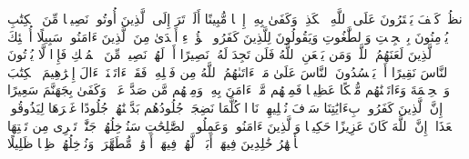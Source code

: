\stopbuffer
\startbuffer[\q:4:50]
ٱنظُرۡ كَیۡفَ یَفۡتَرُونَ عَلَى ٱللَّهِ ٱلۡكَذِبَۖ وَكَفَىٰ بِهِۦۤ إِثۡمࣰا مُّبِینًا%
\stopbuffer
\startbuffer[\q:4:51]
أَلَمۡ تَرَ إِلَى ٱلَّذِینَ أُوتُوا۟ نَصِیبࣰا مِّنَ ٱلۡكِتَٰبِ یُؤۡمِنُونَ بِٱلۡجِبۡتِ وَٱلطَّٰغُوتِ وَیَقُولُونَ لِلَّذِینَ كَفَرُوا۟ هَٰۤؤُلَاۤءِ أَهۡدَىٰ مِنَ ٱلَّذِینَ ءَامَنُوا۟ سَبِیلًا%
\stopbuffer
\startbuffer[\q:4:52]
أُو۟لَٰۤئِكَ ٱلَّذِینَ لَعَنَهُمُ ٱللَّهُۖ وَمَن یَلۡعَنِ ٱللَّهُ فَلَن تَجِدَ لَهُۥ نَصِیرًا%
\stopbuffer
\startbuffer[\q:4:53]
أَمۡ لَهُمۡ نَصِیبࣱ مِّنَ ٱلۡمُلۡكِ فَإِذࣰا لَّا یُؤۡتُونَ ٱلنَّاسَ نَقِیرًا%
\stopbuffer
\startbuffer[\q:4:54]
أَمۡ یَحۡسُدُونَ ٱلنَّاسَ عَلَىٰ مَاۤ ءَاتَىٰهُمُ ٱللَّهُ مِن فَضۡلِهِۦۖ فَقَدۡ ءَاتَیۡنَاۤ ءَالَ إِبۡرَٰهِیمَ ٱلۡكِتَٰبَ وَٱلۡحِكۡمَةَ وَءَاتَیۡنَٰهُم مُّلۡكًا عَظِیمࣰا%
\stopbuffer
\startbuffer[\q:4:55]
فَمِنۡهُم مَّنۡ ءَامَنَ بِهِۦ وَمِنۡهُم مَّن صَدَّ عَنۡهُۚ وَكَفَىٰ بِجَهَنَّمَ سَعِیرًا%
\stopbuffer
\startbuffer[\q:4:56]
إِنَّ ٱلَّذِینَ كَفَرُوا۟ بِءَایَٰتِنَا سَوۡفَ نُصۡلِیهِمۡ نَارࣰا كُلَّمَا نَضِجَتۡ جُلُودُهُم بَدَّلۡنَٰهُمۡ جُلُودًا غَیۡرَهَا لِیَذُوقُوا۟ ٱلۡعَذَابَۗ إِنَّ ٱللَّهَ كَانَ عَزِیزًا حَكِیمࣰا%
\stopbuffer
\startbuffer[\q:4:57]
وَٱلَّذِینَ ءَامَنُوا۟ وَعَمِلُوا۟ ٱلصَّٰلِحَٰتِ سَنُدۡخِلُهُمۡ جَنَّٰتࣲ تَجۡرِی مِن تَحۡتِهَا ٱلۡأَنۡهَٰرُ خَٰلِدِینَ فِیهَاۤ أَبَدࣰاۖ لَّهُمۡ فِیهَاۤ أَزۡوَٰجࣱ مُّطَهَّرَةࣱۖ وَنُدۡخِلُهُمۡ ظِلࣰّا ظَلِیلًا%
\stopbuffer
